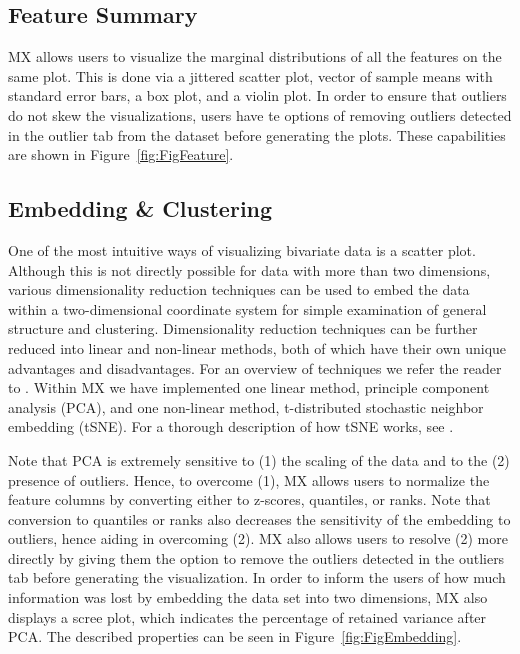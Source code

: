 \documentclass[12pt]{article}
\begin{document}
\subsection{Feature Summary}
\label{subsec:SubSecFeature}

MX allows users to visualize the marginal distributions of all the features on the same plot. This is done via a jittered scatter plot, vector of sample means with standard error bars, a box plot, and a violin plot. In order to ensure that outliers do not skew the visualizations, users have te options of removing outliers detected in the outlier tab from the dataset before generating the plots. These capabilities are shown in  Figure~\ref{fig:FigFeature}.

\subsection{Embedding \& Clustering}
\label{subsec:SubSecEmbedding}

One of the most intuitive ways of visualizing bivariate data is a scatter plot. Although this is not directly possible for data with more than two dimensions, various dimensionality reduction techniques can be used to embed the data within a two-dimensional coordinate system for simple examination of general structure and clustering. Dimensionality reduction techniques can be further reduced into linear and non-linear methods, both of which have their own unique advantages and disadvantages. For an overview of techniques we refer the reader to \cite{van2009dimensionality}. Within MX we have implemented one linear method, principle component analysis (PCA), and one non-linear method, t-distributed stochastic neighbor embedding (tSNE). For a thorough description of how tSNE works, see \cite{van2008visualizing}.

Note that PCA is extremely sensitive to (1) the scaling of the data and to the (2) presence of outliers.  Hence, to overcome (1), MX allows users to normalize the feature columns by converting either to z-scores, quantiles, or ranks. Note that conversion to quantiles or ranks also decreases the sensitivity of the embedding to outliers, hence aiding in overcoming (2). MX also allows users to resolve (2) more directly by giving them the option to remove the outliers detected in the outliers tab before generating the visualization. In order to inform the users of how much information was lost by embedding the data set into two dimensions, MX also displays a scree plot, which indicates the percentage of retained variance after PCA. The described properties can be seen in Figure~\ref{fig:FigEmbedding}.
\end{document}
